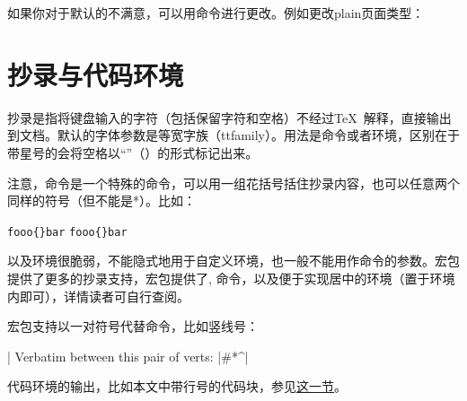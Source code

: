如果你对于默认的不满意，可以用命令进行更改。例如更改plain页面类型：
\begin{latex}
\end{latex}

\section{抄录与代码环境}
抄录是指将键盘输入的字符（包括保留字符和空格）不经过\TeX\ 解释，直接输出到文档。默认的字体参数是等宽字族（ttfamily）。用法是命令或者环境，区别在于带星号的会将空格以“\textvisiblespace”（）的形式标记出来。

注意，命令是一个特殊的命令，可以用一组花括号括住抄录内容，也可以任意两个同样的符号（但不能是*）。比如：
\begin{latex}
\verb|fooo{}bar|
\verb+fooo{}bar+
\end{latex}

以及环境很脆弱，不能隐式地用于自定义环境，也一般不能用作命令的参数。宏包提供了更多的抄录支持，宏包提供了, 命令，以及便于实现居中的环境（置于环境内即可），详情读者可自行查阅。

宏包支持以一对符号代替命令，比如竖线号：
\begin{latex}
\MakeShortVerb|
Verbatim between this pair of verts: |#\?*^|
\end{latex}

代码环境的输出，比如本文中带行号的代码块，参见\hyperref[sec:coding]{这一节}。

